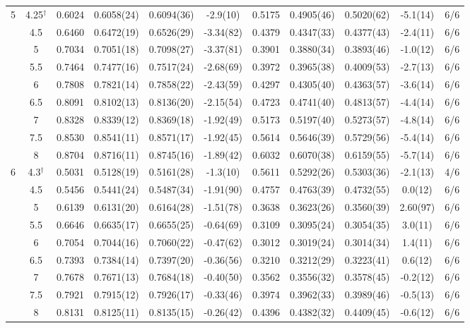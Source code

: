\begin{table}
\begin{tabular}{cc|cccc|cccc|c}
\hline
5 & 4.25$^\dagger$ & 0.6024 & 0.6058(24) & 0.6094(36) & -2.9(10) & 0.5175 & 0.4905(46) & 0.5020(62) & -5.1(14) & 6/6 \\
 & 4.5 & 0.6460 & 0.6472(19) & 0.6526(29) & -3.34(82) & 0.4379 & 0.4347(33) & 0.4377(43) & -2.4(11) & 6/6 \\
 & 5 & 0.7034 & 0.7051(18) & 0.7098(27) & -3.37(81) & 0.3901 & 0.3880(34) & 0.3893(46) & -1.0(12) & 6/6 \\
 & 5.5 & 0.7464 & 0.7477(16) & 0.7517(24) & -2.68(69) & 0.3972 & 0.3965(38) & 0.4009(53) & -2.7(13) & 6/6 \\
 & 6 & 0.7808 & 0.7821(14) & 0.7858(22) & -2.43(59) & 0.4297 & 0.4305(40) & 0.4363(57) & -3.6(14) & 6/6 \\
 & 6.5 & 0.8091 & 0.8102(13) & 0.8136(20) & -2.15(54) & 0.4723 & 0.4741(40) & 0.4813(57) & -4.4(14) & 6/6 \\
 & 7 & 0.8328 & 0.8339(12) & 0.8369(18) & -1.92(49) & 0.5173 & 0.5197(40) & 0.5273(57) & -4.8(14) & 6/6 \\
 & 7.5 & 0.8530 & 0.8541(11) & 0.8571(17) & -1.92(45) & 0.5614 & 0.5646(39) & 0.5729(56) & -5.4(14) & 6/6 \\
 & 8 & 0.8704 & 0.8716(11) & 0.8745(16) & -1.89(42) & 0.6032 & 0.6070(38) & 0.6159(55) & -5.7(14) & 6/6 \\
\hline
6 & 4.3$^\dagger$ & 0.5031 & 0.5128(19) & 0.5161(28) & -1.3(10) & 0.5611 & 0.5292(26) & 0.5303(36) & -2.1(13) & 4/6 \\
 & 4.5 & 0.5456 & 0.5441(24) & 0.5487(34) & -1.91(90) & 0.4757 & 0.4763(39) & 0.4732(55) & 0.0(12) & 6/6 \\
 & 5 & 0.6139 & 0.6131(20) & 0.6164(28) & -1.51(78) & 0.3638 & 0.3623(26) & 0.3560(39) & 2.60(97) & 6/6 \\
 & 5.5 & 0.6646 & 0.6635(17) & 0.6655(25) & -0.64(69) & 0.3109 & 0.3095(24) & 0.3054(35) & 3.0(11) & 6/6 \\
 & 6 & 0.7054 & 0.7044(16) & 0.7060(22) & -0.47(62) & 0.3012 & 0.3019(24) & 0.3014(34) & 1.4(11) & 6/6 \\
 & 6.5 & 0.7393 & 0.7384(14) & 0.7397(20) & -0.36(56) & 0.3210 & 0.3212(29) & 0.3223(41) & 0.6(12) & 6/6 \\
 & 7 & 0.7678 & 0.7671(13) & 0.7684(18) & -0.40(50) & 0.3562 & 0.3556(32) & 0.3578(45) & -0.2(12) & 6/6 \\
 & 7.5 & 0.7921 & 0.7915(12) & 0.7926(17) & -0.33(46) & 0.3974 & 0.3962(33) & 0.3989(46) & -0.5(13) & 6/6 \\
 & 8 & 0.8131 & 0.8125(11) & 0.8135(15) & -0.26(42) & 0.4396 & 0.4382(32) & 0.4409(45) & -0.6(12) & 6/6 \\
\hline\hline
\end{tabular}
\end{table}
